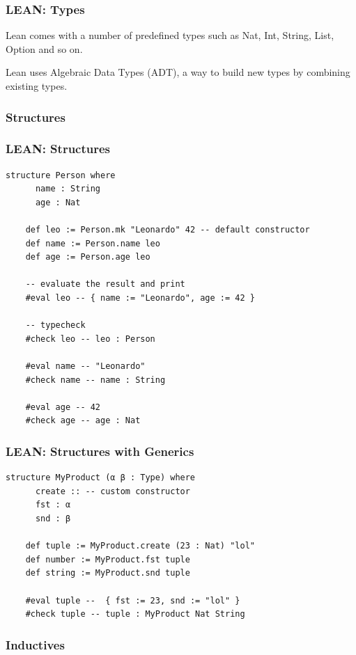 \documentclass{beamer}
\begin{document}
\begin{frame}
  \frametitle{LEAN: Types}

  Lean comes with a number of predefined types such as Nat, Int, String, List, Option and so on.

  \vspace{1cm}

  Lean uses Algebraic Data Types (ADT), a way to build new types by combining existing types.
\end{frame}

\subsubsection{Structures}

\begin{frame}[fragile]
  \frametitle{LEAN: Structures}

  \begin{lstlisting}[language=lean]
    structure Person where
      name : String
      age : Nat

    def leo := Person.mk "Leonardo" 42 -- default constructor
    def name := Person.name leo
    def age := Person.age leo

    -- evaluate the result and print
    #eval leo -- { name := "Leonardo", age := 42 }

    -- typecheck
    #check leo -- leo : Person

    #eval name -- "Leonardo"
    #check name -- name : String

    #eval age -- 42
    #check age -- age : Nat
  \end{lstlisting}
\end{frame}

\begin{frame}[fragile]
  \frametitle{LEAN: Structures with Generics}

  \begin{lstlisting}[language=lean]
    structure MyProduct (α β : Type) where
      create :: -- custom constructor
      fst : α
      snd : β

    def tuple := MyProduct.create (23 : Nat) "lol"
    def number := MyProduct.fst tuple
    def string := MyProduct.snd tuple

    #eval tuple --  { fst := 23, snd := "lol" }
    #check tuple -- tuple : MyProduct Nat String
  \end{lstlisting}
\end{frame}

\subsubsection{Inductives}
\end{document}
